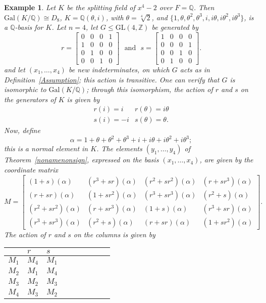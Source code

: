 \documentclass[12pt]{article}
\theoremstyle{plain}
\newtheorem{example}[theorem]{Example}
\newcommand{\Z}{\ensuremath{\mathbb{Z}}}
\newcommand{\Q}{\ensuremath{\mathbb{Q}}}
\begin{document}
\begin{example}
Let $K$ be the splitting field of $x^4-2$ over $F=\Q$. Then
$\mathrm{Gal}(K/\Q) \cong D_8$, $K = \Q(\theta,i)$, with $\theta =
\sqrt[4]{2}$, and $\lbrace 1, \theta, \theta^2, \theta^3, i, i\theta,
i\theta^2, i\theta^3\rbrace$, is a $\Q$-basis for $K$. Let
$n=4$, let
$G\leq \mathrm{GL}(4,\Z)$ be generated by
$$
r = \begin{bmatrix}
0&0&0&1\\
1&0&0&0\\
0&1&0&0\\
0&0&1&0
\end{bmatrix} \,\,\,\, \text{and}\,\,\,\,
s = \begin{bmatrix}
1&0&0&0\\
0&0&0&1\\
0&0&1&0\\
0&1&0&0
\end{bmatrix}.
$$ and let $(x_1,\dots,x_4)$ be new indeterminates, on which $G$ acts as in
Definition~\ref{Assumption}; this action is transitive. One can verify
that $G$ is isomorphic to $\mathrm{Gal}(K/\Q)$; through this isomorphism,
the action of $r$ and $s$ on the generators of $K$ is given by
$$
\begin{matrix}
r(i) = i &r(\theta) = i \theta \\
s(i) = -i & s(\theta) = \theta.
\end{matrix}
$$
Now, define $$\alpha = 1+ \theta + \theta^2 + \theta^3 +i + i\theta + i\theta^2 + i\theta^3;$$
this is a normal element in $K$. 
The elements $(y_1,\dots,y_4)$ of Theorem~\ref{nonamenonsign}, expressed 
on the basis $(x_1,\dots,x_4)$, are given by the coordinate matrix
$$
M= \begin{bmatrix}
(1+s)(\alpha) & (r^3+sr)(\alpha) & (r^2+sr^2)(\alpha) & (r+sr^3)(\alpha)\\
(r+sr)(\alpha) & (1+sr^2)(\alpha) & (r^3+sr^3)(\alpha) & (r^2+s)(\alpha)\\
(r^2+sr^2)(\alpha) & (r+sr^3)(\alpha) & (1+s)(\alpha) & (r^3+sr)(\alpha)\\
(r^3+sr^3)(\alpha) & (r^2+s)(\alpha) & (r+sr)(\alpha) & (1+sr^2)(\alpha)
\end{bmatrix}.
$$
The action of $r$ and $s$ on the columns is given by
\begin{table}[H]
\centering
\begin{tabular}{l|llllllll} 
 & $r$ & $s$ \\
 \hline
 $M_1$  & $M_4$ & $M_1$ \\
$M_2$ & $M_1$ & $M_4$ \\
$M_3$ & $M_2$ & $M_3$ \\
$M_4$ & $M_3$ & $M_2$ 
\end{tabular}
\end{table}
\end{example} 
\end{document}
